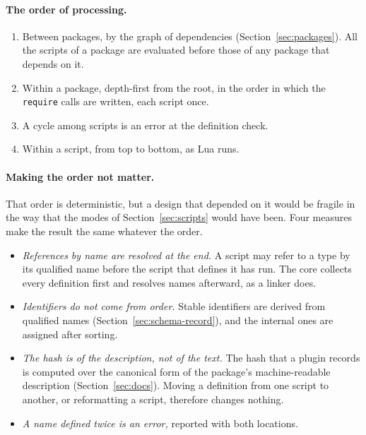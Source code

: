 \documentclass[11pt,a4paper]{article}
\newcommand{\code}[1]{\texttt{#1}}
\begin{document}
\paragraph{The order of processing.}

\begin{enumerate}
  \item Between packages, by the graph of dependencies
        (Section~\ref{sec:packages}).  All the scripts of a package are
        evaluated before those of any package that depends on it.
  \item Within a package, depth-first from the root, in the order in which
        the \code{require} calls are written, each script once.
  \item A cycle among scripts is an error at the definition check.
  \item Within a script, from top to bottom, as Lua runs.
\end{enumerate}

\paragraph{Making the order not matter.}  That order is deterministic, but a
design that depended on it would be fragile in the way that the modes of
Section~\ref{sec:scripts} would have been.  Four measures make the result
the same whatever the order.

\begin{itemize}
  \item \emph{References by name are resolved at the end.}  A script may
        refer to a type by its qualified name before the script that
        defines it has run.  The core collects every definition first and
        resolves names afterward, as a linker does.
  \item \emph{Identifiers do not come from order.}  Stable identifiers are
        derived from qualified names (Section~\ref{sec:schema-record}), and
        the internal ones are assigned after sorting.
  \item \emph{The hash is of the description, not of the text.}  The hash
        that a plugin records is computed over the canonical form of the
        package's machine-readable description (Section~\ref{sec:docs}).
        Moving a definition from one script to another, or reformatting a
        script, therefore changes nothing.
  \item \emph{A name defined twice is an error,} reported with both
        locations.
\end{itemize}
\end{document}
